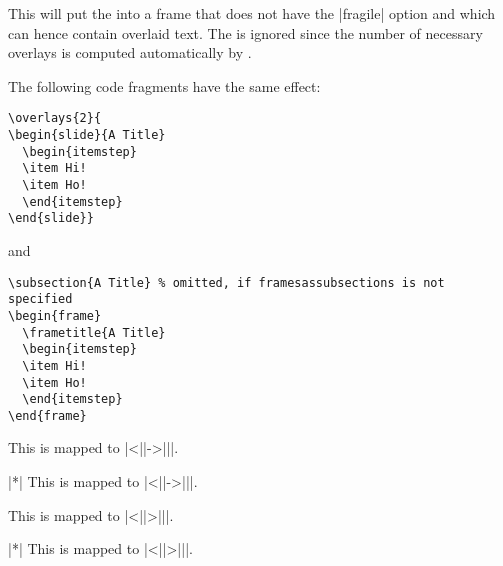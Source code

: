 \begin{command}{\overlays{}}
  This will put the  into a frame that does not have the |fragile| option and which can hence contain overlaid text. The  is ignored since the number of necessary overlays is computed automatically by \beamer.

  \example
  The following code fragments have the same effect:

\begin{verbatim}
\overlays{2}{
\begin{slide}{A Title}
  \begin{itemstep}
  \item Hi!
  \item Ho!
  \end{itemstep}
\end{slide}}
\end{verbatim}
  and
\begin{verbatim}
\subsection{A Title} % omitted, if framesassubsections is not specified
\begin{frame}
  \frametitle{A Title}
  \begin{itemstep}
  \item Hi!
  \item Ho!
  \end{itemstep}
\end{frame}
\end{verbatim}
\end{command}

\begin{command}{\fromSlide{}}
  This is mapped to |\uncover<||->{||}|.
\end{command}

\begin{command}{\fromSlide|*|}
  This is mapped to |\only<||->{||}|.
\end{command}

\begin{command}{\onlySlide{}}
  This is mapped to |\uncover<||>{||}|.
\end{command}

\begin{command}{\onlySlide|*|}
  This is mapped to |\only<||>{||}|.
\end{command}

